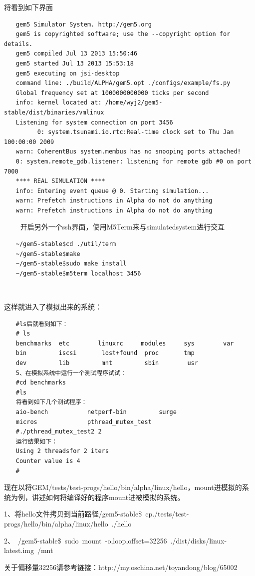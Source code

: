 将看到如下界面
\begin{verbatim}
　　gem5 Simulator System. http://gem5.org
　　gem5 is copyrighted software; use the --copyright option for details.
　　gem5 compiled Jul 13 2013 15:50:46
　　gem5 started Jul 13 2013 15:53:18
　　gem5 executing on jsi-desktop
　　command line: ./build/ALPHA/gem5.opt ./configs/example/fs.py
　　Global frequency set at 1000000000000 ticks per second
　　info: kernel located at: /home/wyj2/gem5-stable/dist/binaries/vmlinux
　　Listening for system connection on port 3456
　　      0: system.tsunami.io.rtc:Real-time clock set to Thu Jan  100:00:00 2009
　　warn: CoherentBus system.membus has no snooping ports attached!
　　0: system.remote_gdb.listener: listening for remote gdb #0 on port 7000
　　**** REAL SIMULATION ****
　　info: Entering event queue @ 0. Starting simulation...
　　warn: Prefetch instructions in Alpha do not do anything
　　warn: Prefetch instructions in Alpha do not do anything
\end{verbatim}
　　
开启另外一个ssh界面，使用M5Term来与simulatedsystem进行交互
\begin{verbatim}
　　~/gem5-stable$cd ./util/term  
　　~/gem5-stable$make  
　　~/gem5-stable$sudo make install  
　　~/gem5-stable$m5term localhost 3456 
\end{verbatim}　　

这样就进入了模拟出来的系统：
\begin{verbatim}
　　#ls后就看到如下：
　　# ls
　　benchmarks  etc        linuxrc     modules     sys        var
　　bin         iscsi       lost+found  proc       tmp
　　dev         lib         mnt         sbin        usr
　　5、在模拟系统中运行一个测试程序试试：
　　#cd benchmarks
　　#ls
　　将看到如下几个测试程序：
　　aio-bench           netperf-bin         surge
　　micros              pthread_mutex_test
　　#./pthread_mutex_test2 2
　　运行结果如下：
　　Using 2 threadsfor 2 iters
　　Counter value is 4
　　#
\end{verbatim}

现在以将GEM/tests/test-progs/hello/bin/alpha/linux/hello，mount进模拟的系统为例，讲述如何将编译好的程序mount进被模拟的系统。

1、将hello文件拷贝到当前路径/gem5-stable\$ cp./tests/test-progs/hello/bin/alpha/linux/hello ./hello  

2、~/gem5-stable\$ sudo mount -o,loop,offset=32256 ./dist/disks/linux-latest.img /mnt  

关于偏移量32256请参考链接：http://my.oschina.net/toyandong/blog/65002  

